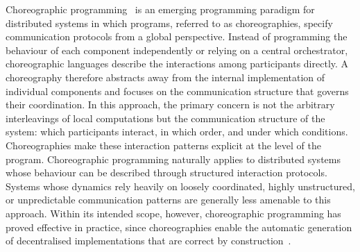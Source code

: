 Choreographic programming~\cite{M23} is an emerging programming
paradigm for distributed systems in which programs, referred to as
choreographies, specify communication protocols from a global
perspective. Instead of programming the behaviour of each component
independently or relying on a central orchestrator, choreographic
languages describe the interactions among participants directly. A
choreography therefore abstracts away from the internal implementation
of individual components and focuses on the communication structure
that governs their coordination.
%
In this approach, the primary concern is not the arbitrary
interleavings of local computations but the communication structure of
the system: which participants interact, in which order, and under
which conditions. Choreographies make these interaction patterns
explicit at the level of the program.
%
Choreographic programming naturally applies to distributed systems
whose behaviour can be described through structured interaction
protocols. Systems whose dynamics rely heavily on loosely coordinated,
highly unstructured, or unpredictable communication patterns are
generally less amenable to this approach. Within its intended scope,
however, choreographic programming has proved effective in practice,
since choreographies enable the automatic generation of decentralised
implementations that are correct by construction~\cite{CM13}.


